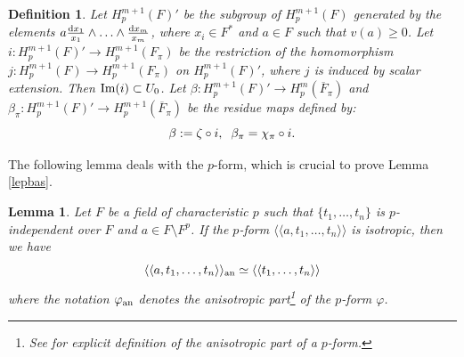 \documentclass[times,10pt]{amsart}
\newcommand{\dd}{{\rm d}}
\renewcommand{\phi}{\varphi}
\renewcommand{\cong}{\simeq}
\newtheorem{defn}[thm]{Definition}%
\newtheorem{lemma}[thm]{Lemma}%
\begin{document}
{\begin{defn}
     Let ${H_p^{m+1}}(F)'$ be  the subgroup of $H_p^{m+1}(F)$ generated by the elements {$ a\frac{\dd x_1}{ x_1}\wedge \ldots\wedge \frac{\dd x_m}{x_m} $}, where  $x_i\in F^*$ and $a\in F$ such that  $v(a)\geq 0$. Let $ i: H_p^{m+1}(F)'\xrightarrow{} H_p^{m+1}(F_{\pi})$ be the   restriction of the  homomorphism $j:H_p^{m+1}(F)\xrightarrow{}H_p^{m+1}(F_{\pi})$ on $H_p^{m+1}(F)'$, where $j$ is  induced by {scalar extension}.   Then $ {\rm Im}(i)\subset U_0$. Let $ \beta: H_p^{m+1}(F)'\xrightarrow{}  H_p^{m}(\overline{F}_{\pi})$     and $ \beta_{\pi}:  H_p^{m+1}(F)'\xrightarrow{} H_p^{m+1}(\overline{F}_{\pi})$  be the residue maps defined by:  $$  \beta:= \zeta\circ i, \hspace{2mm}  \beta_{\pi}= \chi_{\pi}\circ i.$$
\end{defn}
 The following lemma deals with the $p$-form, which is crucial to prove Lemma \ref{lepbas}.
\begin{lemma}\label{lan} Let $F$ be a field of characteristic $p$ such that $\{t_1,\ldots,t_n\}$ is $p$-independent over $F$ and $a\in F\setminus F^p$. If the $p$-form $\langle \langle a,t_1,\ldots,t_n\rangle\rangle$ is isotropic, then  we have $$ \langle\langle a, t_1,\ldots, t_n\rangle\rangle_{\rm an}\cong \langle\langle t_1,\ldots,t_n\rangle\rangle$$ where  the notation $\phi_{\rm an}$  denotes the anisotropic part\footnote[8]{See \cite[Definition 2.11]{Hoffmann1} for  explicit  definition of  the anisotropic part of a $p$-form.} of the  $p$-form $\phi$.
    
\end{lemma}

}
\end{document}

